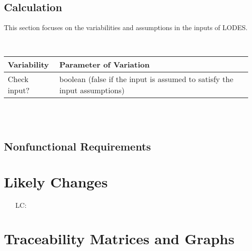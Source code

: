 \documentclass[12pt]{article}
\newcounter{lcnum} %
\newcommand{\progname}{LODES} %
\begin{document}
~\newline

\subsection{Calculation} \label{Sec_calc}

This section focuses on the variabilities and assumptions in the inputs of \progname{}.

~\newline

\noindent
\begin{minipage}{\textwidth}
\renewcommand*{\arraystretch}{1.5}
\begin{tabular}{|p{}| p{}|}
  \hline
  \rowcolor[gray]{0.9}
  Variability& Parameter of Variation\\
  \hline
  Check input? & boolean (false if the input is assumed to satisfy the input assumptions)\\

  \hline
\end{tabular}
\end{minipage}\\

~\newline

\subsection{Nonfunctional Requirements}


\section{Likely Changes}    

\noindent \begin{itemize}

\item[LC\refstepcounter{lcnum}\thelcnum\label{LC_meaningfulLabel}:] 

\end{itemize}

\section{Traceability Matrices and Graphs}
\end{document}
